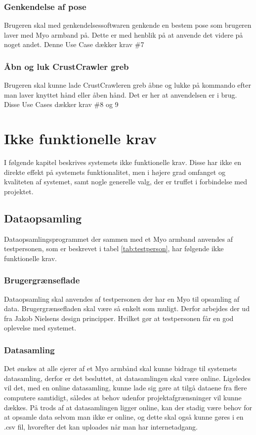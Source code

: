 \subsubsection{Genkendelse af pose}
Brugeren skal med genkendelsessoftwaren genkende en bestem pose som brugeren laver med Myo armband på. Dette er med henblik på at anvende det videre på noget andet. Denne Use Case dækker krav \#7
\subsubsection{Åbn og luk CrustCrawler greb}
Brugeren skal kunne lade CrustCrawleren greb åbne og lukke på kommando efter man laver knyttet hånd eller åben hånd. Det er her at anvendelsen er i brug. Disse Use Cases dækker krav \#8 og 9

\section{Ikke funktionelle krav}
\label{sec:ikkefunktionellekrav}
I følgende kapitel beskrives systemets ikke funktionelle krav. Disse har ikke en direkte effekt på systemets funktionalitet, men i højere grad omfanget og kvaliteten af systemet, samt nogle generelle valg, der er truffet i forbindelse med projektet.

\subsection*{Dataopsamling}
Dataopsamlingsprogrammet der sammen med et Myo armband anvendes af testpersonen, som er beskrevet i tabel \ref{tab:testperson}, har følgende ikke funktionelle krav.

\subsubsection{Brugergrænseflade}
Dataopsamling skal anvendes af testpersonen der har en Myo til opsamling af data. Brugergrænsefladen skal være så enkelt som muligt.  Derfor arbejdes der ud fra Jakob Nielsens design principper. Hvilket gør at testpersonen får en god oplevelse med systemet.

\subsubsection{Datasamling}
Det ønskes at alle ejerer af et Myo armbånd skal kunne bidrage til systemets datasamling, derfor er det besluttet, at datasamlingen skal være online. Ligeledes vil det, med en online datasamling, kunne lade sig gøre at tilgå dataene fra flere computere samtidigt, således at behov udenfor projektafgrænsninger vil kunne dækkes. På trods af at datasamlingen ligger online, kan der stadig være behov for at opsamle data selvom man ikke er online, og dette skal også kunne gøres i en .csv fil, hvorefter det kan uploades når man har internetadgang.

